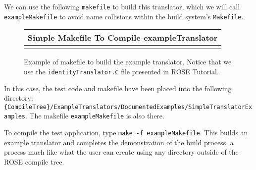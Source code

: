    We can use the following {\tt makefile} to build this translator, which we will call
{\tt exampleMakefile} to avoid name collisions within the build system's {\tt Makefile}.

{\indent
{\mySmallFontSize

\begin{latexonly}
%  
\begin{figure}[tb]
\begin{center}
\begin{tabular}{|c|} \hline
     Simple Makefile To Compile exampleTranslator
\\\hline\hline
   
\\\hline
\end{tabular}
\end{center}
\caption{ Example of makefile to build the example translator. Notice that we use the
    {\tt identityTranslator.C} file presented in ROSE Tutorial. }
\end{figure}
\end{latexonly}

\begin{htmlonly}
   
\end{htmlonly}

\label{usingRose:simpleTranslator_compiling}

}
}

   In this case, the test code and makefile have been placed into the following directory:
{\tt \{CompileTree\}/ExampleTranslators/DocumentedExamples/SimpleTranslatorExamples}.
The makefile {\tt exampleMakefile} is also there.


To compile the test application, type {\tt make -f exampleMakefile}.  This builds an 
example translator and completes the demonstration of the build process, a process 
much like what the user can create using any directory outside of the ROSE compile tree.

